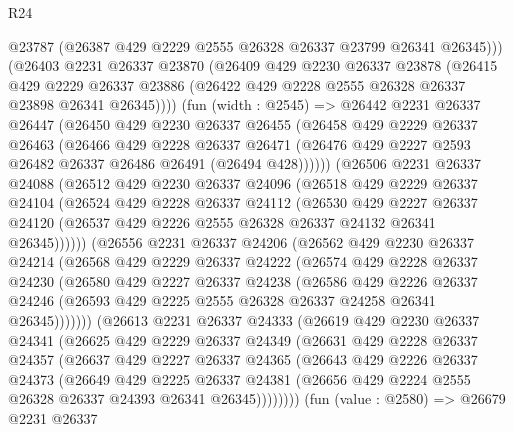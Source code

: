 \begin{lexlean}{R24}
\begin{coremodule}
        @23787
        (@26387 @429 @2229 @2555 @26328 @26337 @23799 @26341 @26345)))
    (@26403
      @2231
      @26337
      @23870
      (@26409
        @429
        @2230
        @26337
        @23878
        (@26415
          @429
          @2229
          @26337
          @23886
          (@26422 @429 @2228 @2555 @26328 @26337 @23898 @26341 @26345))))
    (fun (width : @2545) =>
    @26442
      @2231
      @26337
      @26447
      (@26450
        @429
        @2230
        @26337
        @26455
        (@26458
          @429
          @2229
          @26337
          @26463
          (@26466
            @429
            @2228
            @26337
            @26471
            (@26476 @429 @2227 @2593 @26482 @26337 @26486 @26491 (@26494 @428))))))
    (@26506
      @2231
      @26337
      @24088
      (@26512
        @429
        @2230
        @26337
        @24096
        (@26518
          @429
          @2229
          @26337
          @24104
          (@26524
            @429
            @2228
            @26337
            @24112
            (@26530
              @429
              @2227
              @26337
              @24120
              (@26537 @429 @2226 @2555 @26328 @26337 @24132 @26341 @26345))))))
    (@26556
      @2231
      @26337
      @24206
      (@26562
        @429
        @2230
        @26337
        @24214
        (@26568
          @429
          @2229
          @26337
          @24222
          (@26574
            @429
            @2228
            @26337
            @24230
            (@26580
              @429
              @2227
              @26337
              @24238
              (@26586
                @429
                @2226
                @26337
                @24246
                (@26593 @429 @2225 @2555 @26328 @26337 @24258 @26341 @26345)))))))
    (@26613
      @2231
      @26337
      @24333
      (@26619
        @429
        @2230
        @26337
        @24341
        (@26625
          @429
          @2229
          @26337
          @24349
          (@26631
            @429
            @2228
            @26337
            @24357
            (@26637
              @429
              @2227
              @26337
              @24365
              (@26643
                @429
                @2226
                @26337
                @24373
                (@26649
                  @429
                  @2225
                  @26337
                  @24381
                  (@26656 @429 @2224 @2555 @26328 @26337 @24393 @26341 @26345))))))))
    (fun (value : @2580) =>
    @26679
      @2231
      @26337

\end{coremodule}
\end{lexlean}
